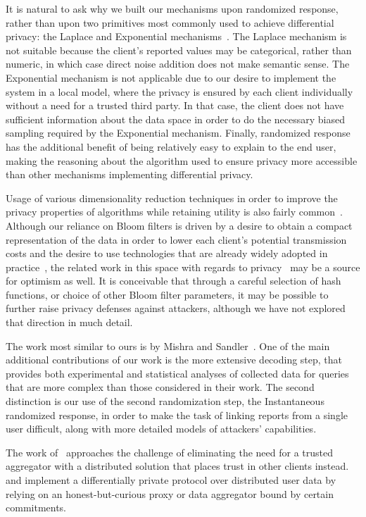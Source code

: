 \documentclass{sig-alternate-2013}
\begin{document}
It is natural to ask why we built our mechanisms upon randomized response, rather than upon two primitives most commonly used to achieve differential privacy: the Laplace and Exponential mechanisms~\cite{dwork06,McSherryT07}. 
The Laplace mechanism is not suitable because the client's reported values may be categorical, rather than numeric, in which case direct noise addition does not make semantic sense. The Exponential mechanism is not applicable due to our desire to implement the system in a local model, where the privacy is ensured by each client individually without a need for a trusted third party. In that case, the client does not have sufficient information about the data space in order to do the necessary biased sampling required by the Exponential mechanism. Finally, randomized response has the additional benefit of being relatively easy to explain to the end user, making the reasoning about the algorithm used to ensure privacy more accessible than other mechanisms implementing differential privacy.

Usage of various dimensionality reduction techniques in order to improve the privacy properties of algorithms while retaining utility is also fairly common~\cite{Liu2012, JL, AggarwalY07, MirMNW11}. Although our reliance on Bloom filters is driven by a desire to obtain a compact representation of the data in order to lower each client's potential transmission costs and the desire to use technologies that are already widely adopted in practice~\cite{BroderM03}, the related work in this space with regards to privacy~\cite{bloom_privacy} may be a source for optimism as well. 
It is conceivable that through a careful selection of hash functions, 
or choice of other Bloom filter parameters, 
it may be possible to further raise privacy defenses against attackers,
although we have not explored that direction in much detail.

The work most similar to ours is by Mishra and Sandler~\cite{MishraS06}. One of the main additional contributions of our work is the more extensive decoding step, that provides both experimental and statistical analyses of collected data for queries that are more complex than those considered in their work. The second distinction is our use of the second randomization step, the Instantaneous randomized response, in order to make the task of linking reports from a single user difficult, along with more detailed models of attackers' capabilities.

The work of~\cite{OurData} approaches the challenge of eliminating the need for a trusted aggregator with a distributed solution that places trust in other clients instead. \cite{chen2012towards} and \cite{Akkus2012} implement a differentially private protocol over distributed user data by relying on an honest-but-curious proxy or data aggregator bound by certain commitments.
\end{document}
